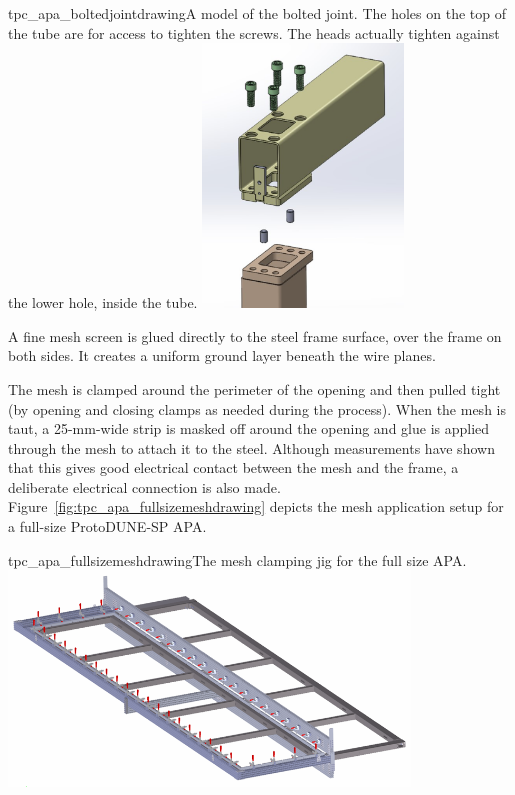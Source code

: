 \begin{cdrfigure}{tpc_apa_boltedjointdrawing}{A model of the bolted joint.  The holes on the top of the tube are for access to tighten the screws.  The heads actually tighten against the lower hole, inside the tube.}
\includegraphics[width=0.4\textwidth]{figures/tpc_apa_boltedjointdrawing.png} 
\end{cdrfigure}

A fine mesh screen is glued directly to the steel frame surface, over the frame on both sides.  It creates a uniform ground layer beneath the wire planes.  

The mesh is clamped around the perimeter of the opening and then pulled tight (by opening and closing clamps as needed during the process).  When the mesh is taut, a 25-mm-wide strip is masked off around the opening and glue is applied through the mesh to attach it to the steel.  Although measurements have shown that this gives good electrical contact between the mesh and the frame, a deliberate electrical connection is also made.  Figure~\ref{fig:tpc_apa_fullsizemeshdrawing} depicts the mesh application setup for a full-size ProtoDUNE-SP APA.

\begin{cdrfigure}{tpc_apa_fullsizemeshdrawing}{The mesh clamping jig for the full size APA. }
\includegraphics[width=0.8\textwidth]{figures/tpc_apa_fullsizemeshdrawing.png} 
\end{cdrfigure}


